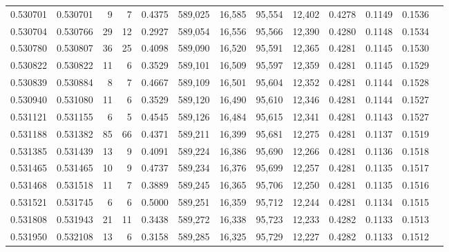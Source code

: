 \begin{tabular}{rrrrrrrrrrrrr}
0.530701 & 0.530701 &     9 &     7 &                                     0.4375 & 589,025 &  16,585 &  95,554 &  12,402 & 0.4278 & 0.1149 & 0.1536 \\
0.530704 & 0.530766 &    29 &    12 &                                     0.2927 & 589,054 &  16,556 &  95,566 &  12,390 & 0.4280 & 0.1148 & 0.1534 \\
0.530780 & 0.530807 &    36 &    25 &                                     0.4098 & 589,090 &  16,520 &  95,591 &  12,365 & 0.4281 & 0.1145 & 0.1530 \\
0.530822 & 0.530822 &    11 &     6 &                                     0.3529 & 589,101 &  16,509 &  95,597 &  12,359 & 0.4281 & 0.1145 & 0.1529 \\
0.530839 & 0.530884 &     8 &     7 &                                     0.4667 & 589,109 &  16,501 &  95,604 &  12,352 & 0.4281 & 0.1144 & 0.1528 \\
0.530940 & 0.531080 &    11 &     6 &                                     0.3529 & 589,120 &  16,490 &  95,610 &  12,346 & 0.4281 & 0.1144 & 0.1527 \\
0.531121 & 0.531155 &     6 &     5 &                                     0.4545 & 589,126 &  16,484 &  95,615 &  12,341 & 0.4281 & 0.1143 & 0.1527 \\
0.531188 & 0.531382 &    85 &    66 &                                     0.4371 & 589,211 &  16,399 &  95,681 &  12,275 & 0.4281 & 0.1137 & 0.1519 \\
0.531385 & 0.531439 &    13 &     9 &                                     0.4091 & 589,224 &  16,386 &  95,690 &  12,266 & 0.4281 & 0.1136 & 0.1518 \\
0.531465 & 0.531465 &    10 &     9 &                                     0.4737 & 589,234 &  16,376 &  95,699 &  12,257 & 0.4281 & 0.1135 & 0.1517 \\
0.531468 & 0.531518 &    11 &     7 &                                     0.3889 & 589,245 &  16,365 &  95,706 &  12,250 & 0.4281 & 0.1135 & 0.1516 \\
0.531521 & 0.531745 &     6 &     6 &                                     0.5000 & 589,251 &  16,359 &  95,712 &  12,244 & 0.4281 & 0.1134 & 0.1515 \\
0.531808 & 0.531943 &    21 &    11 &                                     0.3438 & 589,272 &  16,338 &  95,723 &  12,233 & 0.4282 & 0.1133 & 0.1513 \\
0.531950 & 0.532108 &    13 &     6 &                                     0.3158 & 589,285 &  16,325 &  95,729 &  12,227 & 0.4282 & 0.1133 & 0.1512 \\

\end{tabular}
